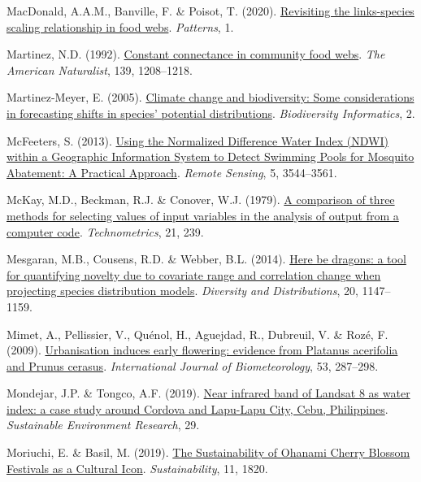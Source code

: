 \documentclass[
  letterpaper,
]{scrbook}
\newlength{\cslhangindent}
\newenvironment{CSLReferences}[2] %
 {\begin{list}{}{%
  \setlength{\itemindent}{0pt}
  \setlength{\leftmargin}{0pt}
  \setlength{\parsep}{0pt}
  \ifodd #1
   \setlength{\leftmargin}{\cslhangindent}
   \setlength{\itemindent}{-1\cslhangindent}
  \fi
  \setlength{\itemsep}{#2\baselineskip}}}
 {\end{list}}
\begin{document}
\begin{CSLReferences}{1}{0}
MacDonald, A.A.M., Banville, F. \& Poisot, T. (2020).
\href{https://doi.org/10.1016/j.patter.2020.100079}{Revisiting the
links-species scaling relationship in food webs}. \emph{Patterns}, 1.

Martinez, N.D. (1992).
\href{http://www.jstor.org/stable/2462337}{Constant connectance in
community food webs}. \emph{The American Naturalist}, 139, 1208--1218.

Martinez-Meyer, E. (2005).
\href{https://doi.org/10.17161/bi.v2i0.8}{Climate change and
biodiversity: Some considerations in forecasting shifts in species'
potential distributions}. \emph{Biodiversity Informatics}, 2.

McFeeters, S. (2013). \href{https://doi.org/10.3390/rs5073544}{Using the
Normalized Difference Water Index (NDWI) within a Geographic Information
System to Detect Swimming Pools for Mosquito Abatement: A Practical
Approach}. \emph{Remote Sensing}, 5, 3544--3561.

McKay, M.D., Beckman, R.J. \& Conover, W.J. (1979).
\href{https://doi.org/10.2307/1268522}{A comparison of three methods for
selecting values of input variables in the analysis of output from a
computer code}. \emph{Technometrics}, 21, 239.

Mesgaran, M.B., Cousens, R.D. \& Webber, B.L. (2014).
\href{https://doi.org/10.1111/ddi.12209}{Here be dragons: a tool for
quantifying novelty due to covariate range and correlation change when
projecting species distribution models}. \emph{Diversity and
Distributions}, 20, 1147--1159.

Mimet, A., Pellissier, V., Quénol, H., Aguejdad, R., Dubreuil, V. \&
Rozé, F. (2009).
\href{https://doi.org/10.1007/s00484-009-0214-7}{Urbanisation induces
early flowering: evidence from Platanus acerifolia and Prunus cerasus}.
\emph{International Journal of Biometeorology}, 53, 287--298.

Mondejar, J.P. \& Tongco, A.F. (2019).
\href{https://doi.org/10.1186/s42834-019-0016-5}{Near infrared band of
Landsat 8 as water index: a case study around Cordova and Lapu-Lapu
City, Cebu, Philippines}. \emph{Sustainable Environment Research}, 29.

Moriuchi, E. \& Basil, M. (2019).
\href{https://doi.org/10.3390/su11061820}{The Sustainability of Ohanami
Cherry Blossom Festivals as a Cultural Icon}. \emph{Sustainability}, 11,
1820.


\end{CSLReferences}
\end{document}
